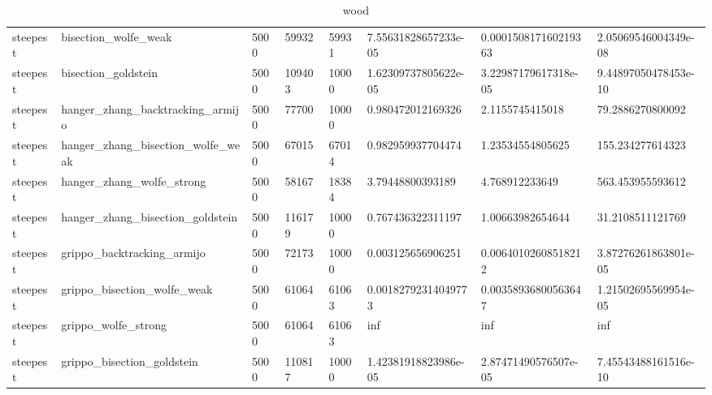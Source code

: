 \documentclass[a4paper,11pt]{article}
\numberwithin{equation}{section} %
\begin{document}
\begin{table}[h!]
{\begin{tabular}{|l|l|l|l|l|l|l|l|}
        steepest & bisection\_wolfe\_weak & 5000 & 59932 & 59931 & 7.55631828657233e-05 & 0.000150817160219363 & 2.05069546004349e-08 \\
        steepest & bisection\_goldstein & 5000 & 109403 & 10000 & 1.62309737805622e-05 & 3.22987179617318e-05 & 9.44897050478453e-10 \\
        steepest & hanger\_zhang\_backtracking\_armijo & 5000 & 77700 & 10000 & 0.980472012169326 & 2.1155745415018 & 79.2886270800092 \\
        steepest & hanger\_zhang\_bisection\_wolfe\_weak & 5000 & 67015 & 67014 & 0.982959937704474 & 1.23534554805625 & 155.234277614323 \\
        steepest & hanger\_zhang\_wolfe\_strong & 5000 & 58167 & 18384 & 3.79448800393189 & 4.768912233649 & 563.453955593612 \\
        steepest & hanger\_zhang\_bisection\_goldstein & 5000 & 116179 & 10000 & 0.767436322311197 & 1.00663982654644 & 31.2108511121769 \\
        steepest & grippo\_backtracking\_armijo & 5000 & 72173 & 10000 & 0.003125656906251 & 0.00640102608518212 & 3.87276261863801e-05 \\
        steepest & grippo\_bisection\_wolfe\_weak & 5000 & 61064 & 61063 & 0.00182792314049773 & 0.00358936800563647 & 1.21502695569954e-05 \\
        steepest & grippo\_wolfe\_strong & 5000 & 61064 & 61063 & inf & inf & inf \\
        steepest & grippo\_bisection\_goldstein & 5000 & 110817 & 10000 & 1.42381918823986e-05 & 2.87471490576507e-05 & 7.45543488161516e-10 \\
\end{tabular}}
\caption{wood}
\label{table:wood}
\end{table}
\end{document}
